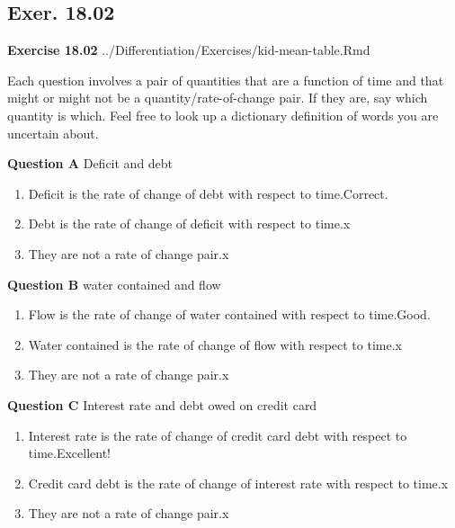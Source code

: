 \documentclass[
  letterpaper,
  DIV=11,
  numbers=noendperiod,
  oneside]{article}
\providecommand{\tightlist}{%
  \setlength{\itemsep}{0pt}\setlength{\parskip}{0pt}}\usepackage{longtable,booktabs,array}
\begin{document}
\begin{multicols}{2}
\hypertarget{exer.-18.02}{%
\section*{Exer. 18.02}\label{exer.-18.02}}

\textbf{Exercise 18.02} ../Differentiation/Exercises/kid-mean-table.Rmd

Each question involves a pair of quantities that are a function of time
and that might or might not be a quantity/rate-of-change pair. If they
are, say which quantity is which. Feel free to look up a dictionary
definition of words you are uncertain about.

\textbf{Question A} Deficit and debt

\begin{enumerate}
\def\labelenumi{\roman{enumi}.}
\tightlist
\item
  {Deficit is the rate of change of debt with respect to
  time.{Correct.~}}\\
\item
  {Debt is the rate of change of deficit with respect to time.{x}}\\
\item
  {They are not a rate of change pair.{x}}
\end{enumerate}

\textbf{Question B} water contained and flow

\begin{enumerate}
\def\labelenumi{\roman{enumi}.}
\tightlist
\item
  {Flow is the rate of change of water contained with respect to
  time.{Good.~}}\\
\item
  {Water contained is the rate of change of flow with respect to
  time.{x}}\\
\item
  {They are not a rate of change pair.{x}}
\end{enumerate}

\textbf{Question C} Interest rate and debt owed on credit card

\begin{enumerate}
\def\labelenumi{\roman{enumi}.}
\tightlist
\item
  {Interest rate is the rate of change of credit card debt with respect
  to time.{Excellent!~}}\\
\item
  {Credit card debt is the rate of change of interest rate with respect
  to time.{x}}\\
\item
  {They are not a rate of change pair.{x}}
\end{enumerate}


\end{multicols}
\end{document}
